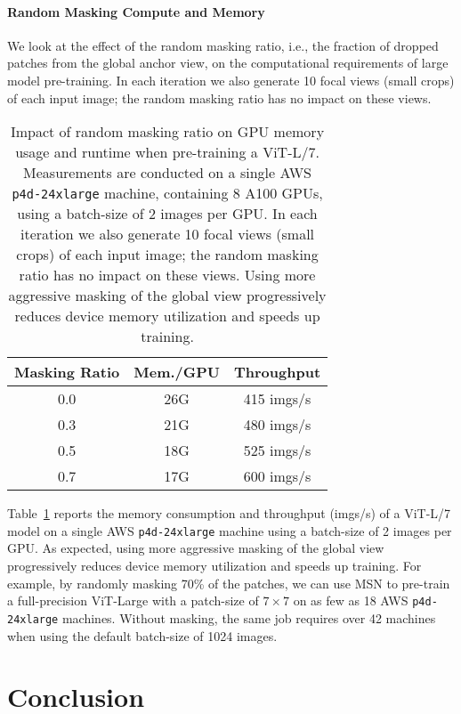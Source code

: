 \documentclass{article}
\begin{document}
\paragraph{Random Masking Compute and Memory}
We look at the effect of the random masking ratio, i.e., the fraction of dropped patches from the global anchor view, on the computational requirements of large model pre-training.
In each iteration we also generate 10 focal views (small crops) of each input image; the random masking ratio has no impact on these views.
\begin{table}[h]
    \centering
    \caption{Impact of random masking ratio on GPU memory usage and runtime when pre-training a ViT-L/7. Measurements are conducted on a single AWS {\tt p4d-24xlarge} machine, containing 8 A100 GPUs, using a batch-size of 2 images per GPU. In each iteration we also generate 10 focal views (small crops) of each input image; the random masking ratio has no impact on these views. Using more aggressive masking of the global view progressively reduces device memory utilization and speeds up training.}
    \label{tb:mask_compute}
    \begin{tabular}{c | c c}
        Masking Ratio & Mem./GPU & Throughput \\\toprule
        0.0 & 26G & 415 imgs/s \\
        0.3 & 21G & 480 imgs/s \\
        0.5 & 18G & 525 imgs/s \\
        \rowcolor{fbApp}
        0.7 & 17G & 600 imgs/s \\
        \bottomrule
    \end{tabular}
\end{table}

Table~\ref{tb:mask_compute} reports the memory consumption and throughput (imgs/s) of a ViT-L/7 model on a single AWS {\tt p4d-24xlarge} machine using a batch-size of 2 images per GPU.
As expected, using more aggressive masking of the global view progressively reduces device memory utilization and speeds up training.
For example, by randomly masking 70\% of the patches, we can use MSN to pre-train a full-precision ViT-Large with a patch-size of $7\times7$ on as few as 18 AWS {\tt p4d-24xlarge} machines.
Without masking, the same job requires over 42 machines when using the default batch-size of 1024 images.

\section{Conclusion}
\end{document}
